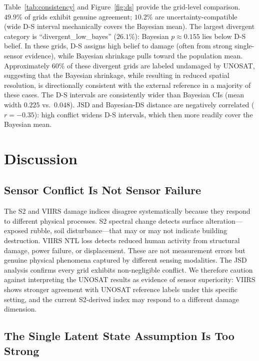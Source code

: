 \documentclass[wcp]{jmlr}
\begin{document}
Table~\ref{tab:consistency} and Figure~\ref{fig:ds} provide the grid-level
comparison. $49.9\%$ of grids exhibit genuine agreement; $10.2\%$ are
uncertainty-compatible (wide D-S interval mechanically covers the Bayesian
mean). The largest divergent category is ``divergent\_low\_bayes''
($26.1\%$): Bayesian $p\approx0.155$ lies below D-S belief. In these
grids, D-S assigns high belief to damage (often from strong single-sensor
evidence), while Bayesian shrinkage pulls toward the population mean.
Approximately $60\%$ of these divergent grids are labeled undamaged by
UNOSAT, suggesting that the Bayesian shrinkage, while resulting in reduced
spatial resolution, is directionally consistent with the external reference
in a majority of these cases. The D-S intervals are consistently wider than
Bayesian CIs (mean width $0.225$ vs.\ $0.048$). JSD and Bayesian-DS
distance are negatively correlated ($r = -0.35$): high conflict widens D-S
intervals, which then more readily cover the Bayesian mean.

\section{Discussion}\label{sec:discussion}

\subsection{Sensor Conflict Is Not Sensor Failure}

The S2 and VIIRS damage indices disagree systematically because they
respond to different physical processes. S2 spectral change detects surface
alteration---exposed rubble, soil disturbance---that may or may not
indicate building destruction. VIIRS NTL loss detects reduced human
activity from structural damage, power failure, or displacement. These are
not measurement errors but genuine physical phenomena captured by different
sensing modalities. The JSD analysis confirms every grid exhibits
non-negligible conflict. We therefore caution against interpreting the
UNOSAT results as evidence of sensor superiority: VIIRS shows stronger
agreement with UNOSAT reference labels under this specific setting, and the
current S2-derived index may respond to a different damage dimension.

\subsection{The Single Latent State Assumption Is Too Strong}
\end{document}
